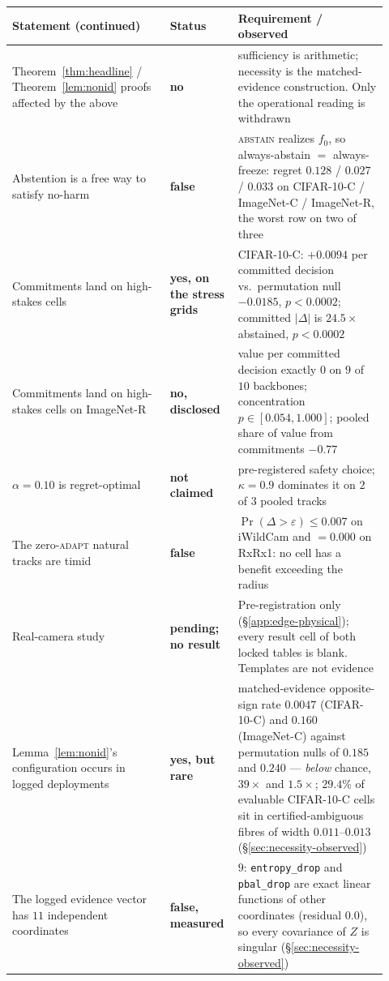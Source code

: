 \begin{center}
\scriptsize
\renewcommand{\arraystretch}{1.12}
\setlength{\tabcolsep}{4pt}
\begin{tabular}{@{}p{0.40\linewidth}p{0.14\linewidth}p{0.38\linewidth}@{}}
\toprule
Statement (continued) & Status & Requirement / observed \\
\midrule
Theorem~\ref{thm:headline} / Theorem~\ref{lem:nonid} proofs affected by the above & \textbf{no} & sufficiency is arithmetic; necessity is the matched-evidence construction. Only the operational reading is withdrawn \\
Abstention is a free way to satisfy no-harm & \textbf{false} & \textsc{abstain} realizes $f_0$, so always-abstain $=$ always-freeze: regret $0.128$ / $0.027$ / $0.033$ on CIFAR-10-C / ImageNet-C / ImageNet-R, the worst row on two of three \\
Commitments land on high-stakes cells & \textbf{yes, on the stress grids} & CIFAR-10-C: $+0.0094$ per committed decision vs.\ permutation null $-0.0185$, $p<0.0002$; committed $|\Delta|$ is $24.5\times$ abstained, $p<0.0002$ \\
Commitments land on high-stakes cells on ImageNet-R & \textbf{no, disclosed} & value per committed decision exactly $0$ on $9$ of $10$ backbones; concentration $p\in[0.054,1.000]$; pooled share of value from commitments $-0.77$ \\
$\alpha{=}0.10$ is regret-optimal & \textbf{not claimed} & pre-registered safety choice; $\kappa{=}0.9$ dominates it on $2$ of $3$ pooled tracks \\
The zero-\textsc{adapt} natural tracks are timid & \textbf{false} & $\Pr(\Delta>\varepsilon)\le0.007$ on iWildCam and $=0.000$ on RxRx1: no cell has a benefit exceeding the radius \\
Real-camera study & \textbf{pending; no result} & Pre-registration only (\S\ref{app:edge-physical}); every result cell of both locked tables is blank. Templates are not evidence \\
Lemma~\ref{lem:nonid}'s configuration occurs in logged deployments & \textbf{yes, but rare} & matched-evidence opposite-sign rate $0.0047$ (CIFAR-10-C) and $0.160$ (ImageNet-C) against permutation nulls of $0.185$ and $0.240$ --- \emph{below} chance, $39\times$ and $1.5\times$; $29.4\%$ of evaluable CIFAR-10-C cells sit in certified-ambiguous fibres of width $0.011$--$0.013$ (\S\ref{sec:necessity-observed}) \\
The logged evidence vector has $11$ independent coordinates & \textbf{false, measured} & $9$: \texttt{entropy\_drop} and \texttt{pbal\_drop} are exact linear functions of other coordinates (residual $0.0$), so every covariance of $Z$ is singular (\S\ref{sec:necessity-observed}) \\
\bottomrule
\end{tabular}
\end{center}

